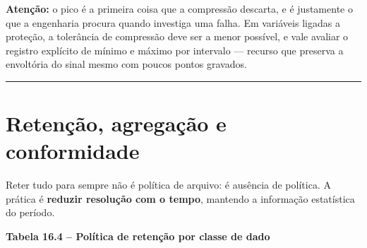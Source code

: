 \begin{caixaatencao}

\textbf{Atenção:} o pico é a primeira coisa que a compressão descarta, e é justamente o que a
engenharia procura quando investiga uma falha. Em variáveis ligadas a proteção, a tolerância de
compressão deve ser a menor possível, e vale avaliar o registro explícito de mínimo e máximo por
intervalo --- recurso que preserva a envoltória do sinal mesmo com poucos pontos gravados.

\end{caixaatencao}

\begin{center}\rule{0.5\linewidth}{0.5pt}\end{center}

\section{Retenção, agregação e conformidade}\label{retenuxe7uxe3o-agregauxe7uxe3o-e-conformidade}

Reter tudo para sempre não é política de arquivo: é ausência de política. A prática é \textbf{reduzir
resolução com o tempo}, mantendo a informação estatística do período.

\textbf{Tabela 16.4 -- Política de retenção por classe de dado}

